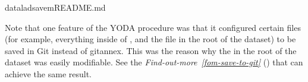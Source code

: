 \begin{sphinxVerbatim}[commandchars=\\\{\}]
dataladsave\PYGZhy{}mREADME.md
\end{sphinxVerbatim}

\sphinxAtStartPar
Note that one feature of the YODA procedure was that it configured certain files
(for example, everything inside of , and the  file in the
root of the dataset) to be saved in Git instead of git\sphinxhyphen{}annex. This was the
reason why the  in the root of the dataset was easily modifiable.
See the \textit{Find-out-more}~{\findoutmoreiconinline}\textit{\ref{fom-save-to-git}} {\hyperref[\detokenize{basics/101-130-yodaproject:fom-save-to-git}]{}} () that can achieve the same result.

